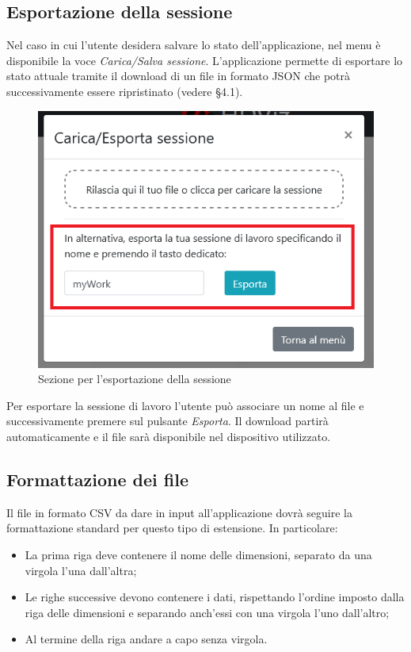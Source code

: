 \subsection{Esportazione della sessione}
Nel caso in cui l'utente desidera salvare lo stato dell'applicazione, nel menu è disponibile la voce \textit{Carica/Salva sessione}. L'applicazione permette di esportare lo stato attuale tramite il download di un file in formato JSON che potrà successivamente essere ripristinato (vedere \S 4.1).
\begin{figure}[H]
		\includegraphics[scale=0.8]{Images/EsportaSessione.png}
		\centering
		\caption{Sezione per l'esportazione della sessione}
\end{figure}
Per esportare la sessione di lavoro l'utente può associare un nome al file e successivamente premere sul pulsante \textit{Esporta}. Il download partirà automaticamente e il file sarà disponibile nel dispositivo utilizzato.
\newpage
\subsection{Formattazione dei file}

Il file in formato CSV da dare in input all'applicazione dovrà seguire la formattazione standard per questo tipo di estensione. In particolare:
\begin{itemize}
	\item La prima riga deve contenere il nome delle dimensioni, separato da una virgola l'una dall'altra;
	\item Le righe successive devono contenere i dati, rispettando l'ordine imposto dalla riga delle dimensioni e separando anch'essi con una virgola l'uno dall'altro;
	\item Al termine della riga andare a capo senza virgola.
\end{itemize}

